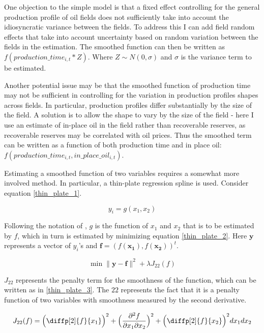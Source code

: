 \documentclass[12pt]{article}
\begin{document}
One objection to the simple model is that a fixed effect controlling for the general production profile of oil fields does not sufficiently take into account the idiosyncratic variance between the fields. To address this I can add field random effects that take into account uncertainty based on random variation between the fields in the estimation. The smoothed function can then be written as $f(production\_time_{i,t}*Z)$.  Where $Z \sim N(0, \sigma)$ and $\sigma$ is the variance term to be estimated.  

Another potential issue may be that the smoothed function of production time may not be sufficient in controlling for the variation in production profiles shapes across fields.  In particular, production profiles differ substantially by the size of the field. A solution is to allow the shape to vary by the size of the field - here I use an estimate of in-place oil in the field rather than recoverable reserves, as recoverable reserves may be correlated with oil prices.  Thus the smoothed term can be written as a function of both production time and in place oil: $f(production\_time_{i,t}, in\_place\_oil_{i,t})$.

Estimating a smoothed function of two variables requires a somewhat more involved method.  In particular, a thin-plate regression spline \citep{wood_thin_2003} is used. Consider equation \ref{thin_plate_1}. 

	\begin{equation}
	y_i = g(x_1, x_2)
	\label{thin_plate_1}
	\end{equation}

Following the notation of \citet{wood_generalized_2006}, $g$ is the function of $x_1$ and $x_2$ that is to be estimated by $f$, which in turn is estimated by minimizing equation \ref{thin_plate_2}.  Here $\boldsymbol{y}$ represents a vector of $y_i$'s and $\boldsymbol{f} = (f(\boldsymbol{x_1}),f(\boldsymbol{x_2}))^t$.   

	\begin{equation}
\min \|\boldsymbol{y-f}\|^2 + \lambda J_{22}(f)
\label{thin_plate_2}
	\end{equation}

$J_{22}$ represents the penalty term for the smoothness of the function, which can be written as in \ref{thin_plate_3}.  The $22$ represents the fact that it is a penalty function of two variables with smoothness measured by the second derivative.

	\begin{equation}
	J_{22}(f)= \Big(  \diffp[2]{f}{x_1} \Big)^2 +
	 \Big(\frac{\partial^2 f}{\partial x_1 \partial x_2}\Big)^2 + 
	\Big(\diffp[2]{f}{x_2} \Big)^2dx_1 dx_2
\label{thin_plate_3}
	\end{equation}
\end{document}
